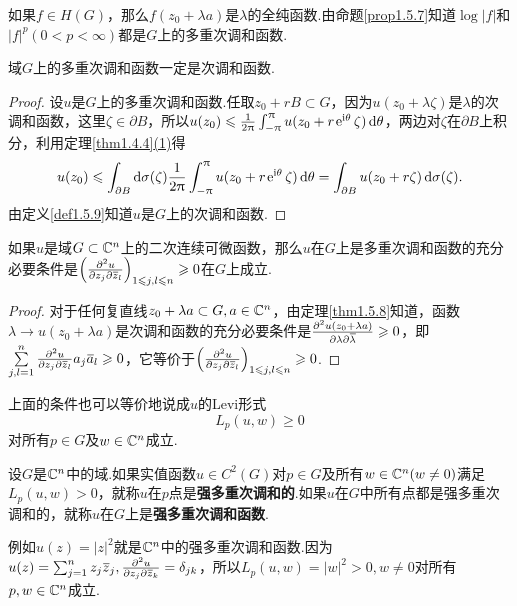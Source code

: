 如果$f\in H(G)$，那么$f(z_0+\lambda a)$是$\lambda$的全纯函数.由命题\ref{prop1.5.7}知道$\log|f|$和$|f|^p(0<p<\infty)$都是$G$上的多重次调和函数.
\begin{prop}\label{prop5.4.2}
	域$G$上的多重次调和函数一定是次调和函数.
\end{prop}
\begin{proof}
	设$u$是$G$上的多重次调和函数.任取$z_0+rB\subset G$，因为$u(z_0+\lambda\zeta)$是$\lambda$的次调和函数，这里$\zeta\in\partial B$，所以$u(z_0)\leqslant\frac1{2\uppi}\int_{-\uppi}^{\uppi}u(z_0+r\operatorname{\!\!\;\mathrm e}^{\mathrm i\theta}\zeta)\mathop{}\!\mathrm{d}\theta$，两边对$\zeta$在$\partial B$上积分，利用定理\ref{thm1.4.4}\hyperlink{1.4.4}{(1)}得
	\[u(z_0)\leqslant\int_{\partial B}\mathop{}\!\mathrm{d}\sigma(\zeta)\frac1{2\uppi}\int_{-\uppi}^{\uppi}u(z_0+r\operatorname{\!\!\;\mathrm e}^{\mathrm i\theta}\zeta)\mathop{}\!\mathrm{d}\theta=\int_{\partial B}u(z_0+r\zeta)\mathop{}\!\mathrm{d}\sigma(\zeta).\]
	由定义\ref{def1.5.9}知道$u$是$G$上的次调和函数.
\end{proof}
\begin{prop}\label{prop5.4.3}
	如果$u$是域$G\subset\mathbb C^n$上的二次连续可微函数，那么$u$在$G$上是多重次调和函数的充分必要条件是$\left(\frac{\partial^2 u}{\partial z_j\partial {}\mkern1mu\overline{\mkern-1muz}_l}\right)_{1\leqslant j,l\leqslant n}\geqslant0$在$G$上成立.
\end{prop}
\begin{proof}
	对于任何复直线$z_0+\lambda a\subset G,a\in\mathbb C^n$，由定理\ref{thm1.5.8}知道，函数$\lambda\to u(z_0+\lambda a)$是次调和函数的充分必要条件是$\frac{\partial^2 u(z_0+\lambda a)}{\partial \lambda\partial {}\mkern1mu\overline{\mkern-1mu\lambda}}\geqslant0$，即$\sum\limits_{j,l=1}^n \frac{\partial^2 u}{\partial z_j\partial {}\mkern1mu\overline{\mkern-1muz}_l}a_j{}\mkern1mu\overline{\mkern-1mua}_l\geqslant0$，它等价于$\left(\frac{\partial^2 u}{\partial z_j\partial {}\mkern1mu\overline{\mkern-1muz}_l}\right)_{1\leqslant j,l\leqslant n}\geqslant0$.
\end{proof}
上面的条件也可以等价地说成$u$的Levi形式
\[L_p(u,w)\ge0\]
对所有$p\in G$及$w\in\mathbb C^n$成立.
\begin{definition}\label{def5.4.4}
	设$G$是$\mathbb C^n$中的域.如果实值函数$u\in C^2(G)$对$p\in G$及所有$w\in\mathbb C^n(w\neq0)$满足$L_p(u,w)>0$，就称$u$在$p$点是\textbf{强多重次调和的}.如果$u$在$G$中所有点都是强多重次调和的，就称$u$在$G$上是\textbf{强多重次调和函数}.
\end{definition}
例如$u(z)=|z|^2$就是$\mathbb C^n$中的强多重次调和函数.因为$u(z)=\sum_{j=1}^{n}z_j{}\mkern1mu\overline{\mkern-1muz}_j,\frac{\partial^2 u}{\partial z_j\partial {}\mkern1mu\overline{\mkern-1muz}_k}=\delta_{jk}$，所以$L_p(u,w)=|w|^2>0,w\neq0$对所有$p,w\in\mathbb C^n$成立.

